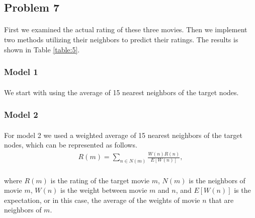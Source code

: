 \subsection*{Problem 7}
\paragraph{}
First we examined the actual rating of these three movies. Then we implement two methods utilizing their neighbors to predict their ratings. The results is shown in Table \ref{table:5}.

\subsubsection*{Model 1}
\paragraph{}
We start with using the average of 15 nearest neighbors of the target nodes. 
\subsubsection*{Model 2}
\paragraph{}
For model 2 we used a weighted average of 15 nearest neighbors of the target nodes, which can be represented as follows.
\begin{align*}
R(m) = \sum_{n \in N(m)} \frac{W(n)R(n)}{E[W(n)]},
\end{align*}
\paragraph{}
where $R(m)$ is the rating of the target movie $m$, $N(m)$ is the neighbors of movie $m$, $W(n)$ is the weight between movie $m$ and $n$, and $E[W(n)]$ is the expectation, or in this case, the average of the weights of movie $n$ that are neighbors of $m$.
